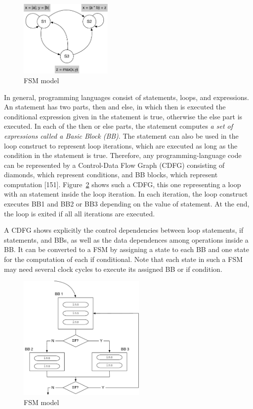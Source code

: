 \begin{figure}[h]
    \centering
    \includegraphics[width=0.4\textwidth]{figures/Introduction/FSM.pdf}
    \caption{FSM model}
    \label{fig:fsm_model}
\end{figure}


In general, programming languages consist of  statements, loops, and expressions.
An  statement has two parts, then and else, in which then is executed  the conditional expression given in the  statement is true, otherwise the else part is executed.
In each of the then or else parts, the  statement computes \emph{a set of expressions called a Basic Block (BB)}.
The  statement can also be used in the loop construct to represent loop iterations, which are executed as long as the condition in the  statement is true.
Therefore, any programming-language code can be represented by a Control-Data Flow Graph (CDFG) consisting of  diamonds, which represent  conditions, and BB blocks, which represent computation [151].
Figure~\ref{fig:dcfg_model} shows such a CDFG, this one representing a loop with an  statement inside the loop iteration.
In each iteration, the loop construct executes BB1 and BB2 or BB3 depending on the value of  statement.
At the end, the loop is exited if all all iterations are executed.

A CDFG shows explicitly the control dependencies between loop statements, if statements, and BBs, as well as the data dependences among operations inside a BB.
It can be converted to a FSM by assigning a state to each BB and one state for the computation of each if conditional.
Note that each state in such a FSM may need several clock cycles to execute its assigned BB or if condition.

\begin{figure}[h]
    \centering
    \includegraphics[width=0.55\textwidth]{figures/Introduction/CFG.pdf}
    \caption{FSM model}
    \label{fig:dcfg_model}
\end{figure}

